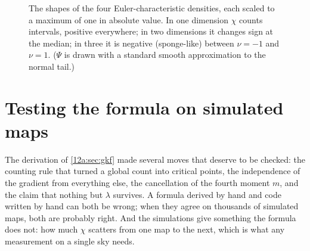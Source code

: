 \begin{figure}[htbp]
\centering
{}
\caption{The shapes of the four Euler-characteristic densities, each scaled to a maximum of one in absolute
value. In one dimension $\chi$ counts intervals, positive everywhere; in two dimensions it changes sign at the
median; in three it is negative (sponge-like) between $\nu=-1$ and $\nu=1$. ($\Psi$ is drawn with a standard
smooth approximation to the normal tail.)}
\label{12a:fig:rhoj}
\end{figure}
\section{Testing the formula on simulated maps}
\label{12a:sec:mc}

The derivation of \cref{12a:sec:gkf} made several moves that deserve to be checked: the counting rule that
turned a global count into critical points, the independence of the gradient from everything else, the
cancellation of the fourth moment $m$, and the claim that nothing but $\lambda$ survives. A formula derived
by hand and code written by hand can both be wrong; when they agree on thousands of simulated maps, both are
probably right. And the simulations give something the formula does not: how much $\chi$ scatters from one
map to the next, which is what any measurement on a single sky needs.

